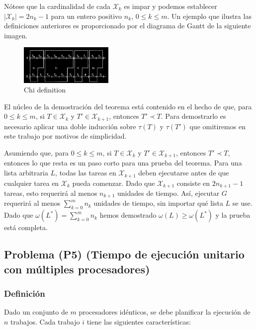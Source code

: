 \documentclass[14pt]{extarticle}
\begin{document}
Nótese que la cardinalidad de cada $\mathcal{X}_k$ es impar y podemos establecer $|\mathcal{X}_k| = 2n_k - 1$ para un entero positivo $n_k$, $0 \leq k \leq m$. Un ejemplo que ilustra las definiciones anteriores es proporcionado por el diagrama de Gantt de la siguiente imagen.

\begin{figure}[h]
    \centering
    \includegraphics[width=0.4\textwidth]{images/chi_gantt.png}
    \caption{Chi definition}
\end{figure}

El núcleo de la demostración del teorema está contenido en el hecho de que, para $0 \leq k \leq m$, si $T \in \mathcal{X}_k$ y $T' \in \mathcal{X}_{k+1}$, entonces $T' \prec T$. Para demostrarlo es necesario aplicar una doble inducción sobre $\tau(T)$ y $\tau(T')$ que omitiremos en este trabajo por motivos de simplicidad.

Asumiendo que, para $0 \leq k \leq m$, si $T \in \mathcal{X}_k$ y $T' \in \mathcal{X}_{k+1}$, entonces $T' \prec T$, entonces lo que resta es un paso corto para una prueba del teorema. Para una lista arbitraria $L$, todas las tareas en $\mathcal{X}_{k+1}$ deben ejecutarse antes de que cualquier tarea en $\mathcal{X}_k$ pueda comenzar. Dado que $\mathcal{X}_{k+1}$ consiste en $2n_{k+1} - 1$ tareas, esto requerirá al menos $n_{k+1}$ unidades de tiempo. Así, ejecutar $G$ requerirá al menos $\sum_{k=0}^{m} n_k$ unidades de tiempo, sin importar qué lista $L$ se use. Dado que $\omega(L^*) = \sum_{k=0}^{m} n_k$ hemos demostrado $\omega(L) \geq \omega(L^*)$ y la prueba está completa.

\subsection*{Problema (P5) (Tiempo de ejecución unitario con múltiples procesadores)}

\subsubsection*{Definición}

Dado un conjunto de $m$ procesadores idénticos, se debe planificar la ejecución de $n$ trabajos. Cada trabajo $i$ tiene las siguientes características:
\end{document}
